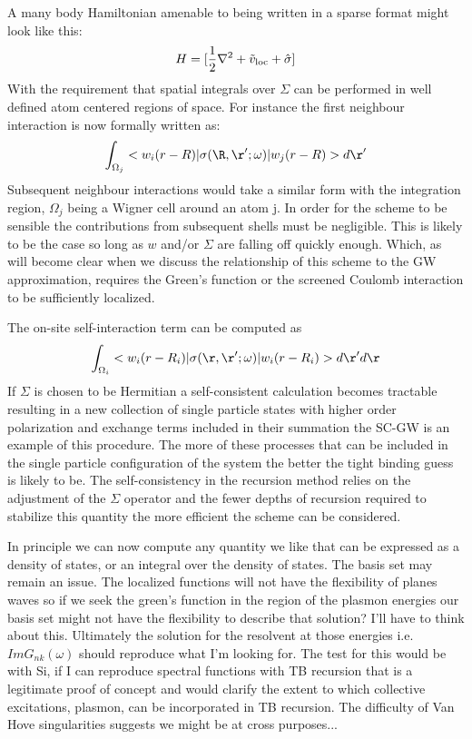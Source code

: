 A many body Hamiltonian amenable to being written in a sparse format might look like this:
%
\begin{equation}
H = [\frac{1}{2}\nabla^{2} + \tilde{v}_{\rm loc} + \hat{\sigma}]
\end{equation}
%
	With the requirement that spatial integrals over $\Sigma$ can be performed in 
well defined atom centered regions of space. For instance 
the first neighbour interaction is now formally written as: 
%
\begin{equation}
\int_{\Omega_{j}}<w_{i}(r-R)|\sigma(\R,\r';\omega)|w_{j}(r-R)>d\r'
\end{equation}
%
	Subsequent neighbour interactions would take a similar form
with the integration region, $\Omega_{j}$ being a Wigner cell around an 
atom j. In order for the scheme to be sensible the contributions from subsequent shells 
must be negligible. This is likely to be the case so long as $w$ and/or $\Sigma$ 
are falling off quickly enough. Which, as will become clear when we discuss
the relationship of this scheme to the GW approximation, requires 
the Green's function or the screened Coulomb interaction 
to be sufficiently localized.

The on-site self-interaction term can be computed as
%
\begin{equation}
\int_{\Omega_{i}}<w_{i}(r-R_{i})|\sigma(\r,\r';\omega)|w_{i}(r-R_{i})>d\r'd\r
\end{equation}
%
If $\Sigma$ is chosen to be Hermitian a self-consistent calculation 
becomes tractable resulting in a new collection of single particle 
states with higher order polarization and exchange terms included 
in their summation the SC-GW is an example of this procedure. The more of
these processes that can be included in the single particle configuration of the
system the better the tight binding guess is likely to be. The self-consistency
in the recursion method relies on the adjustment of the $\Sigma$ operator and the
fewer depths of recursion required to stabilize this quantity the more efficient the
scheme can be considered.

In principle we can now compute any quantity we like that can be expressed
as a density of states, or an integral over the density of states.
The basis set may remain an issue. The localized functions will not have the 
flexibility of planes waves so if we seek the green's function in the 
region of the plasmon energies our basis set might not have the flexibility 
to describe that solution? I'll have to think about this. Ultimately the 
solution for the resolvent at those energies i.e. $ImG_{nk}(\omega)$ should 
reproduce what I'm looking for. The test for this would be with Si, if 
I can reproduce spectral functions with TB recursion that is a legitimate 
proof of concept and would clarify the extent to which collective excitations,
plasmon, can be incorporated in TB recursion. The difficulty of 
Van Hove singularities suggests we might be at cross purposes...

